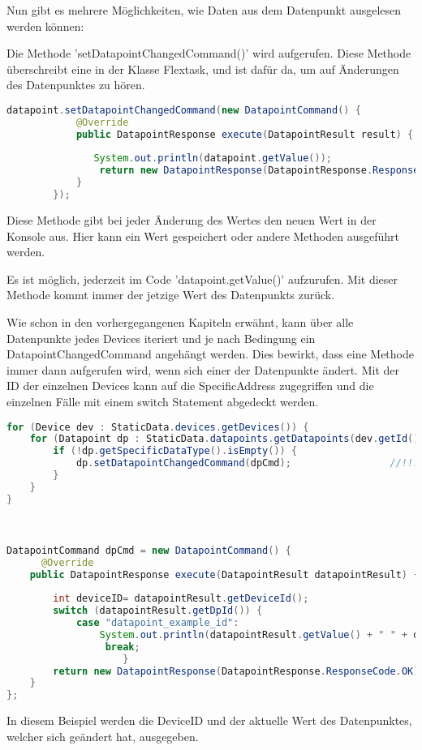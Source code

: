 Nun gibt es mehrere Möglichkeiten, wie Daten aus dem Datenpunkt ausgelesen werden können:
\begin{compactenum}
    \item Die Methode 'setDatapointChangedCommand()' wird aufgerufen. Diese Methode überschreibt eine in der Klasse Flextask, und ist dafür da, um auf Änderungen des Datenpunktes zu hören.

    \begin{lstlisting}[language=java,caption=Example datapoint usage,label=lst:impl:foo]
        datapoint.setDatapointChangedCommand(new DatapointCommand() { 
            @Override 
            public DatapointResponse execute(DatapointResult result) { 
         
               System.out.println(datapoint.getValue()); 
                return new DatapointResponse(DatapointResponse.ResponseCode.OK); 
            } 
        }); 
    \end{lstlisting}
    Diese Methode gibt bei jeder Änderung des Wertes den neuen Wert in der Konsole aus. Hier kann ein Wert gespeichert oder andere Methoden ausgeführt werden.

    \item Es ist möglich, jederzeit im Code 'datapoint.getValue()' aufzurufen. Mit dieser Methode kommt immer der jetzige Wert des Datenpunkts zurück.
    \item Wie schon in den vorhergegangenen Kapiteln erwähnt, kann über alle Datenpunkte jedes Devices iteriert und je nach Bedingung ein DatapointChangedCommand angehängt werden. Dies bewirkt, dass eine Methode immer dann aufgerufen wird, wenn sich einer der Datenpunkte ändert. Mit der ID der einzelnen Devices kann auf die SpecificAddress zugegriffen und die einzelnen Fälle mit einem switch Statement abgedeckt werden.
    \begin{lstlisting}[language=java,caption=Example multible datapoint usage,label=lst:impl:foo]
        for (Device dev : StaticData.devices.getDevices()) { 
    for (Datapoint dp : StaticData.datapoints.getDatapoints(dev.getId())) { 
        if (!dp.getSpecificDataType().isEmpty()) { 
            dp.setDatapointChangedCommand(dpCmd);                 //!!! 
        } 
    } 
} 

 

DatapointCommand dpCmd = new DatapointCommand() { 
      @Override 
    public DatapointResponse execute(DatapointResult datapointResult) { 
 
        int deviceID= datapointResult.getDeviceId();  
        switch (datapointResult.getDpId()) { 
            case "datapoint_example_id": 
                System.out.println(datapointResult.getValue() + " " + deviceID ); 
                 break; 
                    } 
        return new DatapointResponse(DatapointResponse.ResponseCode.OK); 
    } 
}; 

    \end{lstlisting}
    In diesem Beispiel werden die DeviceID und der aktuelle Wert des Datenpunktes, welcher sich geändert hat, ausgegeben.
\end{compactenum}

